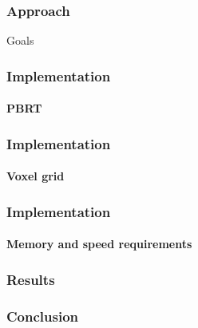 \documentclass{beamer}
\begin{document}
  
  \begin{frame}
    \frametitle{Approach}
	Goals
  \end{frame}
  
  
  \begin{frame}
    \frametitle{Implementation}
    \framesubtitle{PBRT}
  \end{frame}
  
  \begin{frame}
    \frametitle{Implementation}
    \framesubtitle{Voxel grid}
  \end{frame}
  
  \begin{frame}
    \frametitle{Implementation}
    \framesubtitle{Memory and speed requirements}
  \end{frame}
  
  
  
  
  
  \begin{frame}
    \frametitle{Results}
  \end{frame}
  
  \begin{frame}
    \frametitle{Conclusion}
  \end{frame}
  
\end{document}
